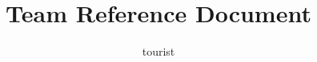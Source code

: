 \documentclass[8pt]{article}
\title{Team Reference Document}
\author{tourist}
\begin{document}
\maketitle
\newpage
\setcounter{page}{1}
\begin{multicols}{2}
    \tableofcontents
    
    
    
    
    
    
    
    
    
    
\end{multicols}
\end{document}
